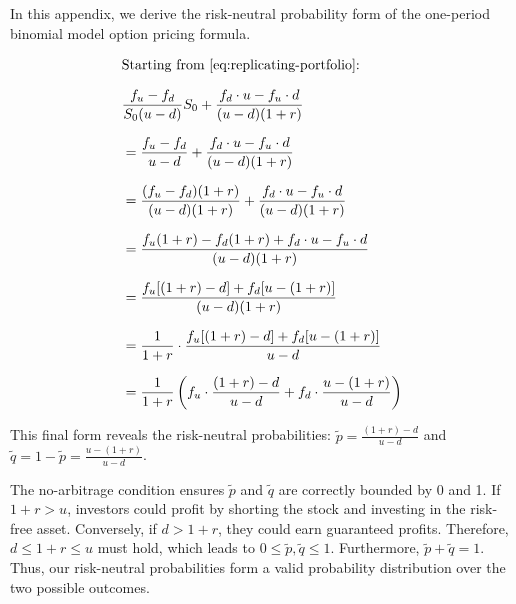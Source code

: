 \documentclass[english,12pt,a4paper,pdftex,sci,utf8]{aaltothesis}
\begin{document}
In this appendix, we derive the risk-neutral probability form of the one-period binomial model option pricing formula.

\begin{align}
&\text{Starting from \eqref{eq:replicating-portfolio}:} \nonumber\\[0.7em]
&\frac{f_u - f_d}{S_0(u-d)}S_0 + \frac{f_d \cdot u-f_u \cdot d}{(u-d)(1+r)} \nonumber\\[0.7em]
&=\frac{f_u - f_d}{u-d} + \frac{f_d \cdot u-f_u \cdot d}{(u-d)(1+r)} \nonumber\\[0.7em]
&=\frac{(f_u - f_d)(1+r)}{(u-d)(1+r)} + \frac{f_d \cdot u - f_u \cdot d}{(u-d)(1+r)} \nonumber\\[0.7em]
&=\frac{f_u(1+r) - f_d(1+r) + f_d \cdot u - f_u \cdot d}{(u-d)(1+r)} \nonumber\\[0.7em]
&= \frac{f_u[(1+r) - d] + f_d[u - (1+r)]}{(u-d)(1+r)} \nonumber\\[0.7em]
&= \frac{1}{1+r} \cdot \frac{f_u[(1+r) - d] + f_d[u - (1+r)]}{u-d} \nonumber\\[0.7em]
&= \frac{1}{1+r} \left( f_u \cdot \frac{(1+r) - d}{u-d} + f_d \cdot \frac{u - (1+r)}{u-d} \right)\nonumber
\end{align}

This final form reveals the risk-neutral probabilities: $\tilde p = \frac{(1+r) - d}{u-d}$ and $\tilde q = 1-\tilde p = \frac{u - (1+r)}{u-d}$.

The no-arbitrage condition ensures $\tilde p$ and $\tilde q$ are correctly bounded by 0 and 1. If $1+r > u$, investors could profit by shorting the stock and investing in the risk-free asset. Conversely, if $d > 1+r$, they could earn guaranteed profits. Therefore, $d \leq 1+r \leq u$ must hold, which leads to $0\leq \tilde p, \tilde q \leq 1$. Furthermore, $\tilde p + \tilde q = 1$. Thus, our risk-neutral probabilities form a valid probability distribution over the two possible outcomes.








\end{document}
